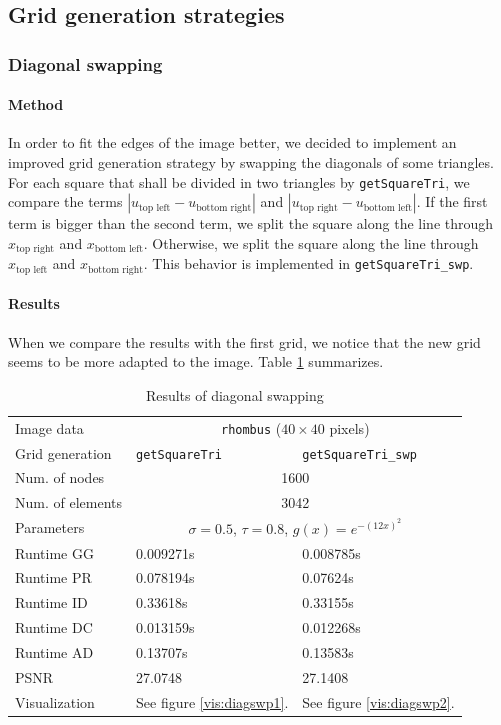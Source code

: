 \documentclass{report}
\begin{document}
\subsection{Grid generation strategies} \label{gridgen}

\subsubsection{Diagonal swapping}
\paragraph{Method}
In order to fit the edges of the image better, we decided to implement an improved grid generation strategy by swapping the diagonals of some triangles. For each square that shall be divided in two triangles by \texttt{getSquareTri}, we compare the terms $|u_\text{top left} - u_\text{bottom right}|$ and $|u_\text{top right} - u_\text{bottom left}|$. If the first term is bigger than the second term, we split the square along the line through $x_\text{top right}$ and $x_\text{bottom left}$. Otherwise, we split the square along the line through $x_\text{top left}$ and $x_\text{bottom right}$. This behavior is implemented in \texttt{getSquareTri\_swp}.

\paragraph{Results}

When we compare the results with the first grid, we notice that the new grid seems to be more adapted to the image. Table \ref{res:diagswp} summarizes.

\begin{table}[h]
	\centering
	\begin{tabular}{|lll}
		Image data & \multicolumn{2}{c}{\texttt{rhombus} ($40 \times 40$ pixels)} \\
		Grid generation & \texttt{getSquareTri} & \texttt{getSquareTri\_swp} \\
		Num. of nodes & \multicolumn{2}{c}{1600} \\
		Num. of elements & \multicolumn{2}{c}{3042} \\
		Parameters & \multicolumn{2}{c}{$\sigma=0.5$, $\tau=0.8$, $g(x) = e^{-(12 x)^2}$} \\
		Runtime GG & 0.009271s & 0.008785s \\
		Runtime PR & 0.078194s & 0.07624s \\
		Runtime ID & 0.33618s & 0.33155s \\
		Runtime DC & 0.013159s & 0.012268s\\
		Runtime AD & 0.13707s & 0.13583s\\
		PSNR & 27.0748 & 27.1408 \\
		Visualization & See figure \ref{vis:diagswp1}. & See figure \ref{vis:diagswp2}. \\
	\end{tabular}
	\caption{Results of diagonal swapping}
	\label{res:diagswp}
\end{table}
\end{document}
